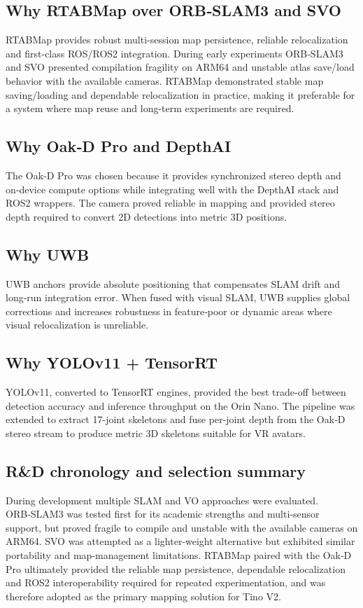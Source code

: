 \subsection*{Why RTABMap over ORB‑SLAM3 and SVO}
RTABMap provides robust multi-session map persistence, reliable relocalization and first-class ROS/ROS2 integration. During early experiments ORB‑SLAM3 and SVO presented compilation fragility on ARM64 and unstable atlas save/load behavior with the available cameras. RTABMap demonstrated stable map saving/loading and dependable relocalization in practice, making it preferable for a system where map reuse and long-term experiments are required.

\subsection*{Why Oak‑D Pro and DepthAI}
The Oak‑D Pro was chosen because it provides synchronized stereo depth and on‑device compute options while integrating well with the DepthAI stack and ROS2 wrappers. The camera proved reliable in mapping and provided stereo depth required to convert 2D detections into metric 3D positions.

\subsection*{Why UWB}
UWB anchors provide absolute positioning that compensates SLAM drift and long‑run integration error. When fused with visual SLAM, UWB supplies global corrections and increases robustness in feature‑poor or dynamic areas where visual relocalization is unreliable.

\subsection*{Why YOLOv11 + TensorRT}
YOLOv11, converted to TensorRT engines, provided the best trade-off between detection accuracy and inference throughput on the Orin Nano. The pipeline was extended to extract 17-joint skeletons and fuse per-joint depth from the Oak‑D stereo stream to produce metric 3D skeletons suitable for VR avatars.

\subsection*{R\&D chronology and selection summary}
During development multiple SLAM and VO approaches were evaluated. ORB‑SLAM3 was tested first for its academic strengths and multi‑sensor support, but proved fragile to compile and unstable with the available cameras on ARM64. SVO was attempted as a lighter‑weight alternative but exhibited similar portability and map‑management limitations. RTABMap paired with the Oak‑D Pro ultimately provided the reliable map persistence, dependable relocalization and ROS2 interoperability required for repeated experimentation, and was therefore adopted as the primary mapping solution for Tino V2.

